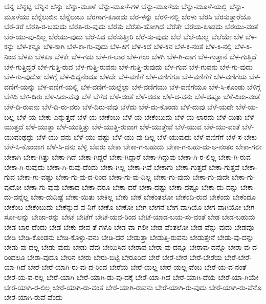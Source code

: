 {ಬೆನ್ನ
ಬೆನ್ನಟ್ಟಿ
ಬೆನ್ನಿನ
ಬೆನ್ನು
ಬೆನ್ನು-ಮೂಳೆ
ಬೆನ್ನು-ಮೂಳೆ-ಗಳ
ಬೆನ್ನು-ಮೂಳೆಯ
ಬೆನ್ನು-ಮೂಳೆ-ಯಲ್ಲಿ
ಬೆನ್ನು-ಮೂಳೆಯು
ಬೆನ್ನೆಲುಬಿನ
ಬೆನ್ನೆಲುಬು
ಬೆರಗಾಗ-ಕೂಡದು
ಬೆರ-ಳನ್ನು
ಬೆರಳಿ-ನಲ್ಲಿ
ಬೆರಳು
ಬೆರಸಿ
ಬೆರಸುತ್ತಾರೆಯೊ
ಬೆರೆ-ತರೆ
ಬೆರೆತಿ-ರ-ಬಹುದು
ಬೆರೆತಿ-ರು-ವುದು
ಬೆರೆತು
ಬೆರೆತು-ಹೋಗಿದೆ
ಬೆರೆತೇ
ಬೆರೆಯ-ಕೂಡದು
ಬೆರೆಯು-ವಂತೆ
ಬೆರೆ-ಯು-ವು-ದಿಲ್ಲ
ಬೆರೆಯು-ವುದು
ಬೆರೆ-ಸಿದ
ಬೆರೆಸುತ್ತೀರಿ
ಬೆರೆ-ಸು-ವುದು
ಬೆಲೆ
ಬೆಲೆ-ಯಿಲ್ಲ
ಬೆಲೆಯೇ
ಬೆಳ
ಬೆಳ-ಕನ್ನು
ಬೆಳ-ಕನ್ನೂ
ಬೆಳ-ಕಾಗಿ
ಬೆಳ-ಕಾ-ಗು-ವುದು
ಬೆಳ-ಕಿಗೆ
ಬೆಳ-ಕಿದೆ
ಬೆಳ-ಕಿನ
ಬೆಳ-ಕಿ-ನಂತೆ
ಬೆಳ-ಕಿ-ನಲ್ಲಿ
ಬೆಳ-ಕಿ-ನಿಂದ
ಬೆಳಕು
ಬೆಳಕೂ
ಬೆಳಕೇ
ಬೆಳ-ಗದು
ಬೆಳ-ಗ-ಲಾರ
ಬೆಳ-ಗಲು
ಬೆಳಗಿ
ಬೆಳ-ಗಿ-ದಾಗ
ಬೆಳ-ಗುತ್ತಾನೆ
ಬೆಳ-ಗುತ್ತಿದೆ
ಬೆಳ-ಗುತ್ತಿದ್ದರೆ
ಬೆಳ-ಗುತ್ತಿ-ರುವ
ಬೆಳ-ಗುತ್ತಿ-ರುವನು
ಬೆಳ-ಗುತ್ತಿ-ರುವುದು
ಬೆಳ-ಗುವ
ಬೆಳ-ಗುವನು
ಬೆಳ-ಗು-ವುದು
ಬೆಳ-ಗು-ವುದೋ
ಬೆಳಗ್ಗೆ
ಬೆಳ-ದಿದ್ದನೆಂದೂ
ಬೆಳದೇ
ಬೆಳ-ವಣಿಗೆ
ಬೆಳ-ವಣಿಗೆಗೂ
ಬೆಳ-ವಣಿಗೆಗೆ
ಬೆಳ-ವಣಿಗೆಯ
ಬೆಳ-ವಣಿಗೆ-ಯನ್ನು
ಬೆಳ-ವಣಿಗೆ-ಯಲ್ಲಿ
ಬೆಳ-ವಣಿಗೆ-ಯಲ್ಲೆಲ್ಲಾ
ಬೆಳ-ವಣಿಗೆಯು
ಬೆಳ-ವಣಿಗೆಯೂ
ಬೆಳ-ಸಿ-ಕೊಂಡು
ಬೆಳಿಗ್ಗೆ
ಬೆಳಿದಿ
ಬೆಳಿ-ದಿರು
ಬೆಳಿ-ಸಿರು-ವೆವು
ಬೆಳೆ
ಬೆಳೆದ
ಬೆಳೆ-ದಂತೆ
ಬೆಳೆ-ದರೂ
ಬೆಳೆ-ದ-ವನು
ಬೆಳೆ-ದಷ್ಟೂ
ಬೆಳೆ-ದಿರು-ವಂತೆ
ಬೆಳೆ-ದಿ-ರುವನು
ಬೆಳೆ-ದಿ-ರು-ವರು
ಬೆಳೆ-ದಿರು-ವೆವು
ಬೆಳೆದು
ಬೆಳೆ-ದು-ಕೊಂಡು
ಬೆಳೆ-ದುವು
ಬೆಳೆ-ಯದೇ
ಬೆಳೆ-ಯ-ಬಲ್ಲ
ಬೆಳೆ-ಯ-ಬೇಕು-ಎನ್ನುತ್ತದೆ
ಬೆಳೆ-ಯ-ಬೇಕೆಂಬು
ಬೆಳೆ-ಯ-ಬೇಕೆಂಬುದು
ಬೆಳೆ-ಯ-ಲಾರದು
ಬೆಳೆ-ಯಿತು
ಬೆಳೆ-ಯುತ್ತದೆ
ಬೆಳೆ-ಯುತ್ತಾ
ಬೆಳೆ-ಯುತ್ತಿತ್ತು
ಬೆಳೆ-ಯುತ್ತಿ-ರುವಾಗ
ಬೆಳೆ-ಯುತ್ತೇವೆ
ಬೆಳೆ-ಯುವ
ಬೆಳೆ-ಯು-ವಂತೆ
ಬೆಳೆ-ಯುವಂಥದ್ದು
ಬೆಳೆ-ಯು-ವನು
ಬೆಳೆ-ಯು-ವಷ್ಟು
ಬೆಳೆ-ಯು-ವು-ದಿಲ್ಲ
ಬೆಳೆ-ಯುವುದು
ಬೆಳೆ-ವಣಿಗೆಗೆ
ಬೆಳೆ-ಸ-ಬೇಕು
ಬೆಳೆ-ಸಿ-ಕೊಂಡಾಗ
ಬೆಳೆ-ಸಿ-ದನು
ಬೆಳ್ಳಿ
ಬೆವರು
ಬೇಕಾ
ಬೇಕಾ-ಗ-ಬಹುದು
ಬೇಕಾ-ಗ-ಬಹು-ದು-ಅ-ನಂತರ
ಬೇಕಾ-ಗಲೀ
ಬೇಕಾಗಿ
ಬೇಕಾ-ಗಿತ್ತು
ಬೇಕಾ-ಗಿದೆ
ಬೇಕಾ-ಗಿದ್ದರೆ
ಬೇಕಾ-ಗಿದ್ದಾರೆ
ಬೇಕಾ-ಗಿದ್ದುವು
ಬೇಕಾ-ಗಿ-ರ-ಲಿಲ್ಲ
ಬೇಕಾ-ಗಿ-ರುವ
ಬೇಕಾ-ಗಿ-ರುವುದು
ಬೇಕಾ-ಗಿ-ರುವು-ದೆಂದು
ಬೇಕಾ-ಗಿಲ್ಲ
ಬೇಕಾ-ಗಿವೆ
ಬೇಕಾಗು
ಬೇಕಾ-ಗುತ್ತದೆ
ಬೇಕಾ-ಗುತ್ತವೆ
ಬೇಕಾ-ಗುವ
ಬೇಕಾ-ಗು-ವಷ್ಟು
ಬೇಕಾ-ಗು-ವು-ದ-ರಿಂದ
ಬೇಕಾ-ಗು-ವು-ದಿಲ್ಲ
ಬೇಕಾ-ಗು-ವುದು
ಬೇಕಾ-ಗು-ವುದೇ
ಬೇಕಾ-ಗು-ವುದೋ
ಬೇಕಾ-ಗು-ವುವು
ಬೇಕಾದ
ಬೇಕಾ-ದರೂ
ಬೇಕಾ-ದರೆ
ಬೇಕಾ-ದಷ್ಟು
ಬೇಕಾ-ದಷ್ಟೂ
ಬೇಕಾ-ದು-ದನ್ನು
ಬೇಕಾ-ದು-ದನ್ನೆಲ್ಲ
ಬೇಕಾ-ದುದಿಷ್ಟೆ
ಬೇಕಾ-ಯಿತು
ಬೇಕಿಲ್ಲ
ಬೇಕು
ಬೇಕೆ
ಬೇಕೆಂತಲೋ
ಬೇಕೆಂದಿ-ರುವ
ಬೇಕೆಂದು
ಬೇಕೆಂದೂ
ಬೇಕೆಂಬ
ಬೇಕೆಂಬುದು
ಬೇಕೆನ್ನುವ-ವ-ನಿಗೆ
ಬೇಕೊ
ಬೇಕೋ
ಬೇಗ
ಬೇಗನೆ
ಬೇಗ-ವಾಗಿಯೊ
ಬೇಗ-ವಾಗಿಯೋ
ಬೇಗ-ಸೋ-ಲನ್ನು
ಬೇಜಾ-ರನ್ನು
ಬೇಟೆ
ಬೇಟೆಗೆ
ಬೇಟೆ-ಯವ-ರಿಂದ
ಬೇಟೆ-ಯಾಡ-ಬಯ-ಸು-ವಂತೆ
ಬೇಡ
ಬೇಡ-ಬಹುದು
ಬೇಡ-ಬಾರ-ದೆಂದು
ಬೇಡ-ಬೇಕು-ದೇವ-ತೆ-ಗಳೊ
ಬೇಡ-ವಾ-ಗಲೀ
ಬೇಡ-ವೆಂತಲೋ
ಬೇಡ-ವೆನ್ನು-ವುದು
ಬೇಡವೊ
ಬೇಡಿ
ಬೇಡಿ-ಕೊಂಡನು
ಬೇಡಿ-ಕೊಳ್ಳು-ವನು
ಬೇಡಿ-ದರೆ
ಬೇಡುತ್ತಾ
ಬೇಡುತ್ತಿ-ರುವನು
ಬೇಡುತ್ತೇನೆ
ಬೇಡು-ವು-ದನ್ನು
ಬೇಡು-ವು-ದಲ್ಲ
ಬೇಡು-ವುದು
ಬೇಡು-ವೆವು
ಬೇಯಿಸಿದ
ಬೇರಾವ
ಬೇರಾ-ವು-ದನ್ನೂ
ಬೇರಾವು-ದನ್ನೊ
ಬೇರಾ-ವು-ದ-ರಿಂದಲೂ
ಬೇರಾ-ವುದೂ
ಬೇರಿನ
ಬೇರು
ಬೇರು-ಬಿಟ್ಟಿ
ಬೇರೂರಿದೆ
ಬೇರೆ
ಬೇರೆ-ಬೇರೆ
ಬೇರೆ-ಬೇರೆಯ
ಬೇರೆ-ಬೇರೆ-ಯಾ-ಗಿದೆ
ಬೇರೆ-ಬೇರೆ-ಯಾಗಿ-ರು-ವು-ದ-ರಿಂದ
ಬೇರೆಯ
ಬೇರೆ-ಯಲ್ಲ
ಬೇರೆ-ಯಲ್ಲ-ವೆಂಬ
ಬೇರೆ-ಯ-ವ-ನಂತೆ
ಬೇರೆ-ಯ-ವ-ರಲ್ಲ
ಬೇರೆ-ಯಾಗಿ
ಬೇರೆ-ಯಾಗಿ-ಡು-ವು-ದಕ್ಕೆ
ಬೇರೆ-ಯಾ-ಗಿದೆ
ಬೇರೆ-ಯಾಗಿ-ದೆಯೆ
ಬೇರೆ-ಯಾ-ಗಿಯೇ
ಬೇರೆ-ಯಾಗಿ-ರ-ಲಿಲ್ಲ
ಬೇರೆ-ಯಾಗಿ-ರು-ವಂತೆ
ಬೇರೆ-ಯಾಗಿ-ರುವನು
ಬೇರೆ-ಯಾಗಿ-ರು-ವುದು
ಬೇರೆ-ಯಾಗಿ-ರು-ವೆನೊ
ಬೇರೆ-ಯಾಗಿ-ರುವೆ-ವೆಂದು
}
